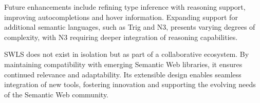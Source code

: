 Future enhancements include refining type inference with reasoning support, improving autocompletions and hover information. Expanding support for additional semantic languages, such as Trig and N3, presents varying degrees of complexity, with N3 requiring deeper integration of reasoning capabilities.

SWLS does not exist in isolation but as part of a collaborative ecosystem. By maintaining compatibility with emerging Semantic Web libraries, it ensures continued relevance and adaptability. Its extensible design enables seamless integration of new tools, fostering innovation and supporting the evolving needs of the Semantic Web community.

